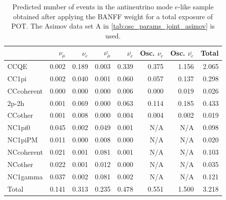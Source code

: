 
\begin{table}
\center
\begin{tabular} { | l ||r | r | r | r | r | r | | r | }
\hline
              & $\nu_\mu$            & $\nu_e$              & $\bar{\nu_\mu}$      & $\bar{\nu_e}$        & Osc. $\nu_e$         & Osc. $\bar{\nu_e}$   & Total                \\ \hline\hline
 CCQE         & 0.002                & 0.189                & 0.003                & 0.339                & 0.375                & 1.156                & 2.065                \\ \hline
 CC1pi        & 0.002                & 0.040                & 0.001                & 0.060                & 0.057                & 0.137                & 0.298                \\ \hline
 CCcoherent   & 0.000                & 0.000                & 0.000                & 0.006                & 0.000                & 0.019                & 0.026                \\ \hline
 2p-2h          & 0.001                & 0.069                & 0.000                & 0.063                & 0.114                & 0.185                & 0.433                \\ \hline
 CCother      & 0.001                & 0.008                & 0.000                & 0.004                & 0.004                & 0.002                & 0.019                \\ \hline
 NC1pi0       & 0.045                & 0.002                & 0.049                & 0.001                & N/A                  & N/A                  & 0.098                \\ \hline
 NC1piPM      & 0.011                & 0.000                & 0.008                & 0.000                & N/A                  & N/A                  & 0.020                \\ \hline
 NCcoherent   & 0.021                & 0.001                & 0.081                & 0.001                & N/A                  & N/A                  & 0.103                \\ \hline
 NCother      & 0.022                & 0.001                & 0.012                & 0.000                & N/A                  & N/A                  & 0.035                \\ \hline
 NC1gamma     & 0.037                & 0.002                & 0.081                & 0.002                & N/A                  & N/A                  & 0.121                \\ \hline
\hline
 Total        & 0.141                & 0.313                & 0.235                & 0.478                & 0.551                & 1.500                & 3.218                \\ \hline

\end{tabular}
\caption{
Predicted number of events in the antineutrino mode $e$-like sample
obtained after applying the BANFF weight
for a total exposure of \TotalPotNuBar{} POT.
The Asimov data set A in \cref{tab:osc_params_joint_asimov} is used.
}
\label{tab:events_rhc1re_Asimov_A}
\end{table}


